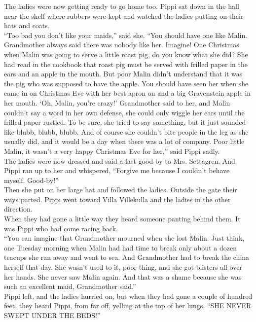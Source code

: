 \documentclass{standard}
\begin{document}
The ladies were now getting ready to go home too. Pippi sat down in the hall near the shelf where rubbers were kept and watched the ladies putting on their hats and coats.\\

“Too bad you don’t like your maids,” said she. “You should have one like Malin. Grandmother always said there was nobody like her. Imagine! One Christmas when Malin was going to serve a little roast pig, do you know what she did? She had read in the cookbook that roast pig must be served with frilled paper in the ears and an apple in the mouth. But poor Malin didn’t understand that it was the pig who was supposed to have the apple. You should have seen her when she came in on Christmas Eve with her best apron on and a big Gravenstein apple in her mouth. ‘Oh, Malin, you’re crazy!’ Grandmother said to her, and Malin couldn’t say a word in her own defense, she could only wiggle her ears until the frilled paper rustled. To be sure, she tried to say something, but it just sounded like blubb, blubb, blubb. And of course she couldn’t bite people in the leg as she usually did, and it would be a day when there was a lot of company. Poor little Malin, it wasn’t a very happy Christmas Eve for her,” said Pippi sadly.\\

The ladies were now dressed and said a last good-by to Mrs. Settagren. And Pippi ran up to her and whispered, “Forgive me because I couldn’t behave myself. Good-by!”\\

Then she put on her large hat and followed the ladies. Outside the gate their ways parted. Pippi went toward Villa Villekulla and the ladies in the other direction.\\

When they had gone a little way they heard someone panting behind them. It was Pippi who had come racing back.\\

“You can imagine that Grandmother mourned when she lost Malin. Just think, one Tuesday morning when Malin had had time to break only about a dozen teacups she ran away and went to sea. And Grandmother had to break the china herself that day. She wasn’t used to it, poor thing, and she got blisters all over her hands. She never saw Malin again. And that was a shame because she was such an excellent maid, Grandmother said.”\\

Pippi left, and the ladies hurried on, but when they had gone a couple of hundred feet, they heard Pippi, from far off, yelling at the top of her lungs, “SHE NEVER SWEPT UNDER THE BEDS!”
\newpage
\end{document}
